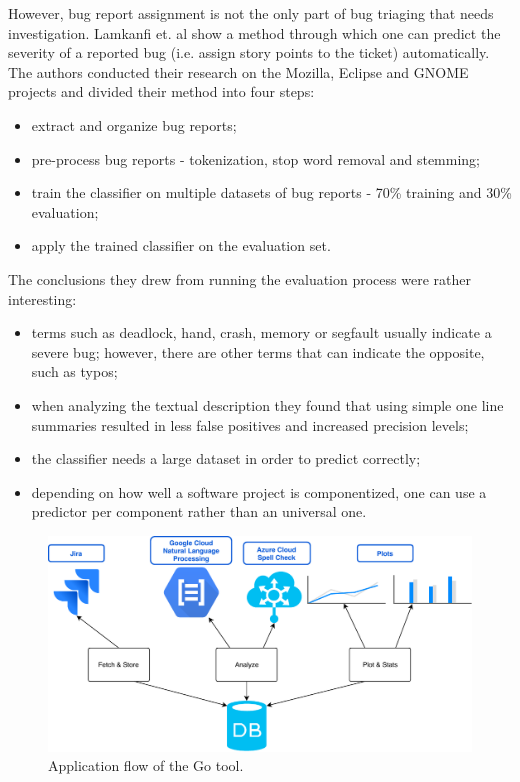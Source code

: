 \documentclass{mpaper}
\begin{document}
However, bug report assignment is not the only part of bug triaging that needs
investigation. Lamkanfi et. al \cite{lamkanfi2010predicting} show a method through which one
can predict the severity of a reported bug (i.e. assign story points to the 
ticket) automatically. The authors conducted their research on the Mozilla,
Eclipse and GNOME projects and divided their method into four steps:
  \begin{itemize}
    \item extract and organize bug reports;
    \item pre-process bug reports - tokenization, stop word removal and stemming;
    \item train the classifier on multiple datasets of bug reports - 70\% 
      training and 30\% evaluation;
    \item apply the trained classifier on the evaluation set.
  \end{itemize}
The conclusions they drew from running the evaluation process were rather 
interesting:
  \begin{itemize}
    \item terms such as deadlock, hand, crash, memory or segfault usually indicate
      a severe bug; however, there are other terms that can indicate the opposite,
      such as typos;
    \item when analyzing the textual description they found that using simple
      one line summaries resulted in less false positives and increased precision
      levels;
    \item the classifier needs a large dataset in order to predict correctly;
    \item depending on how well a software project is componentized, one can 
      use a predictor per component rather than an universal one.
  \end{itemize}

\begin{figure}
\begin{center}
\includegraphics[width=\textwidth]{images/flow.pdf}
\end{center}
\caption{\label{fig-eg}Application flow of the Go tool.}
\end{figure}
\end{document}
